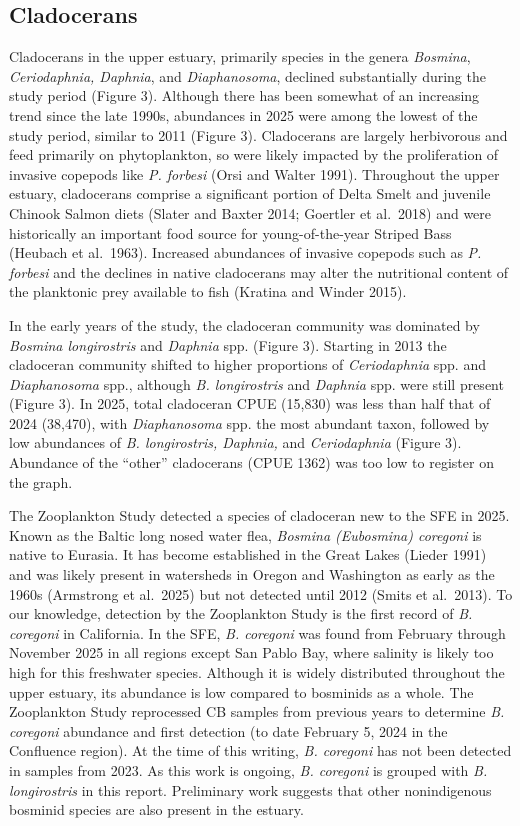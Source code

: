 \documentclass[
  letterpaper,
]{article}
\begin{document}
\subsection{Cladocerans}\label{cladocerans}

Cladocerans in the upper estuary, primarily species in the genera
\emph{Bosmina}, \emph{Ceriodaphnia, Daphnia}, and \emph{Diaphanosoma},
declined substantially during the study period (Figure 3). Although
there has been somewhat of an increasing trend since the late 1990s,
abundances in 2025 were among the lowest of the study period, similar to
2011 (Figure 3). Cladocerans are largely herbivorous and feed primarily
on phytoplankton, so were likely impacted by the proliferation of
invasive copepods like \emph{P. forbesi} (Orsi and Walter 1991).
Throughout the upper estuary, cladocerans comprise a significant portion
of Delta Smelt and juvenile Chinook Salmon diets (Slater and Baxter
2014; Goertler et al.~2018) and were historically an important food
source for young-of-the-year Striped Bass (Heubach et al.~1963).
Increased abundances of invasive copepods such as \emph{P. forbesi} and
the declines in native cladocerans may alter the nutritional content of
the planktonic prey available to fish (Kratina and Winder 2015).

In the early years of the study, the cladoceran community was dominated
by \emph{Bosmina longirostris} and \emph{Daphnia} spp. (Figure 3).
Starting in 2013 the cladoceran community shifted to higher proportions
of \emph{Ceriodaphnia} spp. and \emph{Diaphanosoma} spp., although
\emph{B. longirostris} and \emph{Daphnia} spp. were still present
(Figure 3). In 2025, total cladoceran CPUE (15,830) was less than half
that of 2024 (38,470), with \emph{Diaphanosoma} spp. the most abundant
taxon, followed by low abundances of \emph{B. longirostris, Daphnia,}
and \emph{Ceriodaphnia} (Figure 3). Abundance of the ``other''
cladocerans (CPUE 1362) was too low to register on the graph.

The Zooplankton Study detected a species of cladoceran new to the SFE in
2025. Known as the Baltic long nosed water flea, \emph{Bosmina
(Eubosmina) coregoni} is native to Eurasia. It has become established in
the Great Lakes (Lieder 1991) and was likely present in watersheds in
Oregon and Washington as early as the 1960s (Armstrong et al.~2025) but
not detected until 2012 (Smits et al.~2013). To our knowledge, detection
by the Zooplankton Study is the first record of \emph{B. coregoni} in
California. In the SFE, \emph{B. coregoni} was found from February
through November 2025 in all regions except San Pablo Bay, where
salinity is likely too high for this freshwater species. Although it is
widely distributed throughout the upper estuary, its abundance is low
compared to bosminids as a whole. The Zooplankton Study reprocessed CB
samples from previous years to determine \emph{B. coregoni} abundance
and first detection (to date February 5, 2024 in the Confluence region).
At the time of this writing, \emph{B. coregoni} has not been detected in
samples from 2023. As this work is ongoing, \emph{B. coregoni} is
grouped with \emph{B. longirostris} in this report. Preliminary work
suggests that other nonindigenous bosminid species are also present in
the estuary.
\end{document}
